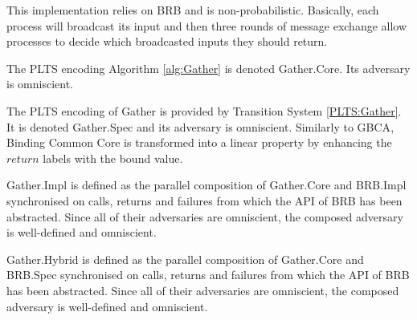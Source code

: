 \begin{implementation}
    \label{impl:Gather}

    This implementation relies on \textsf{BRB} and is non-probabilistic.
    Basically, each process will broadcast its input and then
    three rounds of message exchange allow processes to decide
    which broadcasted inputs they should return.
\end{implementation}

\begin{definition}
    \label{Gather:Core}

    The PLTS encoding Algorithm \ref{alg:Gather} is denoted \textsf{Gather.Core}.
    Its adversary is omniscient.
\end{definition}

\begin{specification}
    \label{Gather:Spec}

    The PLTS encoding of \textsf{Gather} is provided by Transition System \ref{PLTS:Gather}.
    It is denoted \textsf{Gather.Spec} and its adversary is omniscient.
    Similarly to \textsf{GBCA}, Binding Common Core is transformed into a linear
    property by enhancing the $return$ labels with the bound value.
\end{specification}

\begin{definition}
    \label{Gather:Impl}
    \textsf{Gather.Impl} is defined as the parallel composition of
    \textsf{Gather.Core} and \textsf{BRB.Impl}
    synchronised on calls, returns and failures from which the
    API of \textsf{BRB} has been abstracted. Since all of their adversaries
    are omniscient, the composed adversary is well-defined and omniscient.
\end{definition}

\begin{definition}
    \label{Gather:Hybrid}
    \textsf{Gather.Hybrid} is defined as the parallel composition of
    \textsf{Gather.Core} and \textsf{BRB.Spec}
    synchronised on calls, returns and failures from which the
    API of \textsf{BRB} has been abstracted. Since all of their adversaries
    are omniscient, the composed adversary is well-defined and omniscient.
\end{definition}

